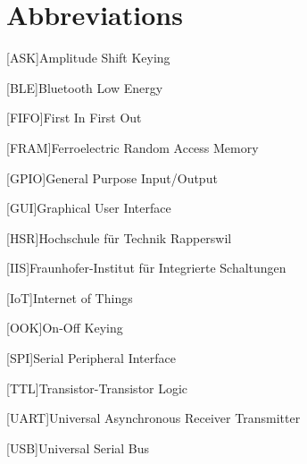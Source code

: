 \chapter*{Abbreviations}
\begin{acronym}
	[ASK]{Amplitude Shift Keying}
\end{acronym}

\begin{acronym}
	[BLE]{Bluetooth Low Energy}
\end{acronym}

\begin{acronym}
	[FIFO]{First In First Out}
\end{acronym}

\begin{acronym}
	[FRAM]{Ferroelectric Random Access Memory}
\end{acronym}

\begin{acronym}
	[GPIO]{General Purpose Input/Output}
\end{acronym}

\begin{acronym}
	[GUI]{Graphical User Interface}
\end{acronym}

\begin{acronym}
	[HSR]{Hochschule für Technik Rapperswil}
\end{acronym}

\begin{acronym}
	[IIS]{Fraunhofer-Institut für Integrierte Schaltungen}
\end{acronym}

\begin{acronym}
	[IoT]{Internet of Things}
\end{acronym}

\begin{acronym}
	[OOK]{On-Off Keying}
\end{acronym}

\begin{acronym}
	[SPI]{Serial Peripheral Interface}
\end{acronym}

\begin{acronym}
	[TTL]{Transistor-Transistor Logic}
\end{acronym}

\begin{acronym}
	[UART]{Universal Asynchronous Receiver Transmitter}
\end{acronym}

\begin{acronym}
	[USB]{Universal Serial Bus}
\end{acronym}









